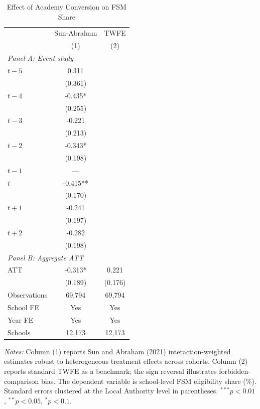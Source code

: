 \begin{table}[htbp]
\centering
\caption{Effect of Academy Conversion on FSM Share}
\label{tab:main}
\begin{tabular}{lcc}
\toprule
 & Sun-Abraham & TWFE \\
 & (1) & (2) \\
\midrule
\multicolumn{3}{l}{\textit{Panel A: Event study}} \\
$t-5$ & 0.311 & \\
 & (0.361) & \\
$t-4$ & -0.435* & \\
 & (0.255) & \\
$t-3$ & -0.221 & \\
 & (0.213) & \\
$t-2$ & -0.343* & \\
 & (0.198) & \\
$t-1$ & \multicolumn{1}{c}{---} & \\
$t$ & -0.415** & \\
 & (0.170) & \\
$t+1$ & -0.241 & \\
 & (0.197) & \\
$t+2$ & -0.282 & \\
 & (0.198) & \\
\midrule
\multicolumn{3}{l}{\textit{Panel B: Aggregate ATT}} \\
ATT & -0.313* & 0.221 \\
 & (0.189) & (0.176) \\
\midrule
Observations & 69,794 & 69,794 \\
School FE & Yes & Yes \\
Year FE & Yes & Yes \\
Schools & 12,173 & 12,173 \\
\bottomrule
\end{tabular}
\begin{tablenotes}
\item \textit{Notes:} Column (1) reports Sun and Abraham (2021) interaction-weighted estimates robust to heterogeneous treatment effects across cohorts. Column (2) reports standard TWFE as a benchmark; the sign reversal illustrates forbidden-comparison bias. The dependent variable is school-level FSM eligibility share (\%). Standard errors clustered at the Local Authority level in parentheses. $^{***}p<0.01$, $^{**}p<0.05$, $^{*}p<0.1$.
\end{tablenotes}
\end{table}

